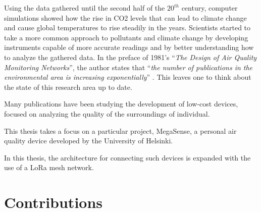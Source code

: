 	
	Using the data gathered until the second half of the $20^{th}$ century, computer simulations showed how the rise in CO2 levels that can lead to climate change and cause global temperatures to rise steadily in the years.
	Scientists started to take a more common approach to pollutants and climate change by developing instruments capable of more accurate readings and by better understanding how to analyze the gathered data.
	In the preface of 1981's ``\textit{The Design of Air Quality Monitoring Networks}'', the author states that ``\textit{the number of publications in the environmental area is increasing exponentially}'' \cite{airqualitynetworks}.
	This leaves one to think about the state of this research area up to date.
	

	Many publications have been studying the development of low-cost devices, focused on analyzing the quality of the surroundings of individual. 
	
	This thesis takes a focus on a particular project, MegaSense, a personal air quality device developed by the University of Helsinki.
	
	In this thesis, the architecture for connecting such devices is expanded with the use of a LoRa mesh network.
	
	\section{Contributions}\label{sec:contributions}
	
